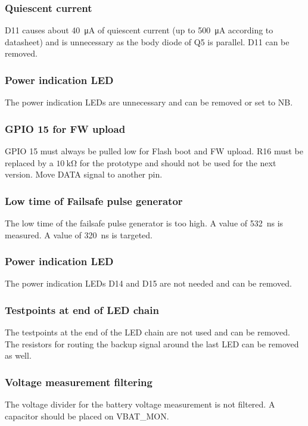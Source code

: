 \subsubsection{Quiescent current}
D11 causes about \qty{40}{\micro\ampere} of quiescent current (up to \qty{500}{\micro\ampere} according to datasheet) and is unnecessary as the body diode of Q5 is parallel. D11 can be removed. 

\subsubsection{Power indication LED}
The power indication \acp{LED} are unnecessary and can be removed or set to NB. 

\subsubsection{GPIO 15 for FW upload}
GPIO 15 must always be pulled low for Flash boot and FW upload. R16 must be replaced by a $\qty{10}{\kilo\ohm}$ for the prototype and should not be used for the next version. Move DATA signal to another pin. 

\subsubsection{Low time of Failsafe pulse generator}
The low time of the failsafe pulse generator is too high. A value of \qty{532}{\nano\s} is measured. A value of \qty{320}{\nano\s} is targeted. 

\subsubsection{Power indication LED}
The power indication \acp{LED} D14 and D15 are not needed and can be removed. 

\subsubsection{Testpoints at end of LED chain}
The testpoints at the end of the \ac{LED} chain are not used and can be removed. The resistors for routing the backup signal around the last LED can be removed as well. 

\subsubsection{Voltage measurement filtering}
The voltage divider for the battery voltage measurement is not filtered. A capacitor should be placed on VBAT\_MON. 

